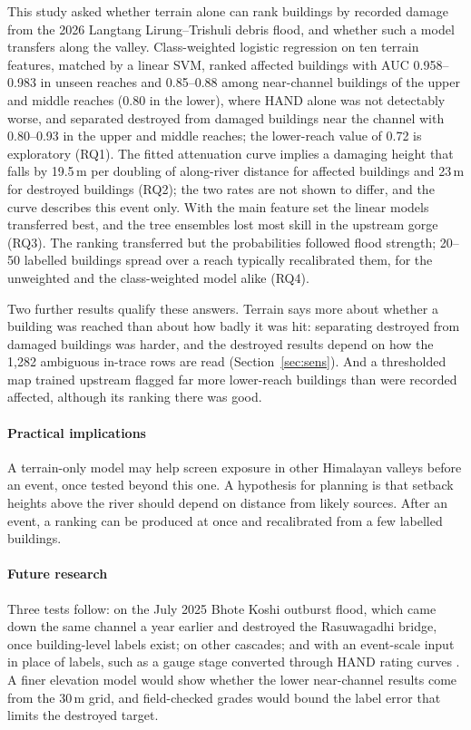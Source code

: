 \documentclass[journal,a4paper]{IEEEtran}
\begin{document}
This study asked whether terrain alone can rank buildings by recorded damage from the 2026 Langtang Lirung--Trishuli debris flood, and whether such a model transfers along the valley. Class-weighted logistic regression on ten terrain features, matched by a linear SVM, ranked affected buildings with AUC 0.958--0.983 in unseen reaches and 0.85--0.88 among near-channel buildings of the upper and middle reaches (0.80 in the lower), where HAND alone was not detectably worse, and separated destroyed from damaged buildings near the channel with 0.80--0.93 in the upper and middle reaches; the lower-reach value of 0.72 is exploratory (RQ1). The fitted attenuation curve implies a damaging height that falls by 19.5\,m per doubling of along-river distance for affected buildings and 23\,m for destroyed buildings (RQ2); the two rates are not shown to differ, and the curve describes this event only. With the main feature set the linear models transferred best, and the tree ensembles lost most skill in the upstream gorge (RQ3). The ranking transferred but the probabilities followed flood strength; 20--50 labelled buildings spread over a reach typically recalibrated them, for the unweighted and the class-weighted model alike (RQ4).

Two further results qualify these answers. Terrain says more about whether a building was reached than about how badly it was hit: separating destroyed from damaged buildings was harder, and the destroyed results depend on how the 1,282 ambiguous in-trace rows are read (Section~\ref{sec:sens}). And a thresholded map trained upstream flagged far more lower-reach buildings than were recorded affected, although its ranking there was good.

\paragraph{Practical implications} A terrain-only model may help screen exposure in other Himalayan valleys before an event, once tested beyond this one. A hypothesis for planning is that setback heights above the river should depend on distance from likely sources. After an event, a ranking can be produced at once and recalibrated from a few labelled buildings.

\paragraph{Future research} Three tests follow: on the July 2025 Bhote Koshi outburst flood, which came down the same channel a year earlier and destroyed the Rasuwagadhi bridge, once building-level labels exist; on other cascades; and with an event-scale input in place of labels, such as a gauge stage converted through HAND rating curves \citep{aristizabal2024}. A finer elevation model would show whether the lower near-channel results come from the 30\,m grid, and field-checked grades would bound the label error that limits the destroyed target.
\end{document}
